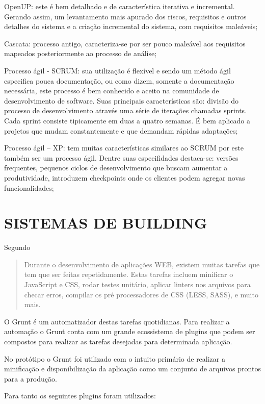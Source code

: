 OpenUP: este é bem detalhado e de característica iterativa e
incremental. Gerando assim, um levantamento mais apurado dos riscos,
requisitos e outros detalhes do sistema e a criação incremental do
sistema, com requisitos maleáveis;

Cascata: processo antigo, caracteriza-se por ser pouco maleável aos
requisitos mapeados posteriormente ao processo de análise;

Processo ágil - SCRUM: sua utilização é flexível e sendo
um método ágil especifica pouca documentação, ou como dizem,
somente a documentação necessária, este processo é bem conhecido e
aceito na comunidade de desenvolvimento de software. Suas principais
características são: divisão do processo de desenvolvimento através
uma série de iterações chamadas sprints. Cada sprint consiste
tipicamente em duas a quatro semanas. É bem aplicado a projetos que
mudam constantemente e que demandam rápidas adaptações;

Processo ágil – XP: tem muitas características similares ao SCRUM
por este também ser um processo ágil. Dentre suas especifidades
destaca-se: versões frequentes, pequenos ciclos de desenvolvimento que
buscam aumentar a produtividade, introduzem checkpoints onde os clientes
podem agregar novas funcionalidades;

\chapter{SISTEMAS DE BUILDING}

Segundo \cite{gruntTutorial}
\begin{quote}
Durante o desenvolvimento de aplicações WEB, existem muitas tarefas
que tem que ser feitas repetidamente. Estas tarefas incluem minificar o
JavaScript e CSS, rodar testes unitário, aplicar linters nos arquivos
para checar erros, compilar os pré processadores de CSS (LESS, SASS), e
muito mais.
\end{quote}

O Grunt é um automatizador destas tarefas quotidianas. Para realizar
a automação o Grunt conta com um grande ecossistema de plugins que
podem ser compostos para realizar as tarefas desejadas para determinada
aplicação.

No protótipo o Grunt foi utilizado com o intuito primário de realizar
a minificação e disponibilização da aplicação como um conjunto de
arquivos prontos para a produção.

Para tanto os seguintes plugins foram utilizados:

